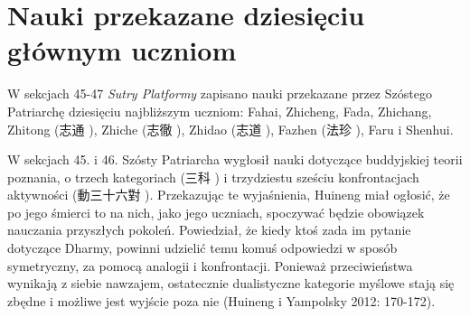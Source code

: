 \section{Nauki przekazane dziesięciu głównym uczniom}
W sekcjach 45-47 \textit{Sutry Platformy} zapisano nauki przekazane przez Szóstego Patriarchę  dziesięciu najbliższym uczniom: Fahai, Zhicheng, Fada, Zhichang, Zhitong (志通 ), Zhiche (志徹 ), Zhidao (志道 ), Fazhen (法珍 ), Faru i Shenhui.

W sekcjach 45. i 46. Szósty Patriarcha wygłosił nauki dotyczące buddyjskiej teorii poznania, o trzech kategoriach (三科 ) i trzydziestu sześciu konfrontacjach aktywności (動三十六對 ). %
Przekazując te wyjaśnienia, Huineng miał ogłosić, że po jego śmierci to na nich, jako jego uczniach, spoczywać będzie obowiązek nauczania przyszłych pokoleń.
Powiedział, że kiedy ktoś zada im pytanie dotyczące Dharmy, powinni  udzielić temu komuś odpowiedzi w sposób symetryczny, za pomocą analogii i konfrontacji.
Ponieważ przeciwieństwa wynikają z siebie nawzajem, ostatecznie dualistyczne kategorie myślowe stają się zbędne i możliwe jest wyjście poza nie
(Huineng i Yampolsky 2012: 170-172).

